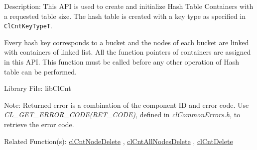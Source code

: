 \begin{Desc}
\item[Description:]This API is used to create and initialize Hash Table Containers with a requested table size. The hash table is created with a 
key type as specified in {\tt{ClCntKeyTypeT}}.
 \par
 Every hash key corresponds to a bucket and the nodes of each bucket are linked with containers of linked list. All the function pointers of 
 containers are assigned in this API. This function must be called before any other operation of Hash table can be performed.
\end{Desc}
\begin{Desc}
\item[Library File:]lib\-Cl\-Cnt\end{Desc}
\begin{Desc}
\item[Note:]Returned error is a combination of the component ID and error code. Use \textit{CL\_\-GET\_\-ERROR\_\-CODE(RET\_\-CODE)}, defined in 
\textit{clCommonErrors.h}, to retrieve the error code.\end{Desc}
\begin{Desc}
\item[Related Function(s):]\hyperlink{pagecnt108}{cl\-Cnt\-Node\-Delete} , \hyperlink{pagecnt106}{cl\-Cnt\-All\-Nodes\-Delete} , 
\hyperlink{pagecnt120}{cl\-Cnt\-Delete} \end{Desc}


\newpage
